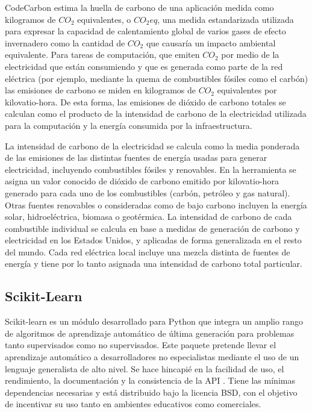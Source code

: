 CodeCarbon estima la huella de carbono de una aplicación medida como kilogramos de $CO_{2}$ equivalentes, o $CO_{2}eq$, una medida estandarizada utilizada para expresar la capacidad de calentamiento global de varios gases de efecto invernadero como la cantidad de $CO_{2}$ que causaría un impacto ambiental equivalente. Para tareas de computación, que emiten $CO_{2}$ por medio de la electricidad que están consumiendo y que es generada como parte de la red eléctrica (por ejemplo, mediante la quema de combustibles fósiles como el carbón) las emisiones de carbono se miden en kilogramos de $CO_{2}$ equivalentes por kilovatio-hora. De esta forma, las emisiones de dióxido de carbono totales se calculan como el producto de la intensidad de carbono de la electricidad utilizada para la computación y la energía consumida por la infraestructura.

La intensidad de carbono de la electricidad se calcula como la media ponderada de las emisiones de las distintas fuentes de energía usadas para generar electricidad, incluyendo combustibles fósiles y renovables. En la herramienta se asigna un valor conocido de dióxido de carbono emitido por kilovatio-hora generado para cada uno de los combustibles (carbón, petróleo y gas natural). Otras fuentes renovables o consideradas como de bajo carbono incluyen la energía solar, hidroeléctrica, biomasa o geotérmica. La intensidad de carbono de cada combustible individual se calcula en base a medidas de generación de carbono y electricidad en los Estados Unidos, y aplicadas de forma generalizada en el resto del mundo. Cada red eléctrica local incluye una mezcla distinta de fuentes de energía y tiene por lo tanto asignada una intensidad de carbono total particular.



\subsection{Scikit-Learn}

Scikit-learn \cite{scikit-learn} es un módulo desarrollado para Python que integra un amplio rango de algoritmos de aprendizaje automático de última generación para problemas tanto supervisados como no supervisados. Este paquete pretende llevar el aprendizaje automático a desarrolladores no especialistas mediante el uso de un lenguaje generalista de alto nivel. Se hace hincapié en la facilidad de uso, el rendimiento, la documentación y la consistencia de la API \cite{scikit-learn-api}. Tiene las mínimas dependencias necesarias y está distribuido bajo la licencia BSD, con el objetivo de incentivar su uso tanto en ambientes educativos como comerciales.

